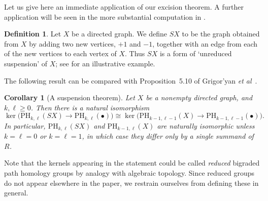 \documentclass[a4paper, 11 pt, oneside, reqno]{amsart}
\numberwithin{lemma}{section}
\newtheorem{corollary}[lemma]{Corollary}
\theoremstyle{definition}
\newtheorem{definition}[lemma]{Definition}
\newcommand{\PH}{\mathrm{PH}}
\begin{document}
Let us give here an immediate application of our excision theorem. A further application will be seen in the more substantial computation in .

\begin{definition}
    Let $X$ be a directed graph.
    We define $SX$ to be the graph obtained from $X$ by 
    adding two new vertices, $+1$ and $-1$, together with an
    edge from each of the new vertices to each vertex of $X$.
    Thus $SX$ is a form of `unreduced suspension' of $X$; see  for an illustrative example.
\end{definition}

The following result can be compared with Proposition~5.10
of Grigor'yan \textit{et al}~\cite{PH-path-complexes}.

\begin{corollary}[A suspension theorem]
\label{cor:suspension}
    Let $X$ be a nonempty directed graph, and
    $k,\ell\geq 0$.
    Then there is a natural isomorphism
    \[
        \ker\bigl(\PH_{k,\ell}(SX)\to\PH_{k,\ell}(\bullet)\bigr)
        \cong
        \ker\bigl(\PH_{k-1,\ell-1}(X)\to\PH_{k-1,\ell-1}(\bullet)\bigr).
    \]
    In particular,
    $\PH_{k,\ell}(SX)$ and $\PH_{k-1,\ell}(X)$ are 
    naturally isomorphic unless $k=\ell=0$ or $k=\ell=1$,
    in which case they differ only by a single summand of $R$.
\end{corollary}

Note that the kernels appearing in the statement could be called
\emph{reduced} bigraded path homology groups by analogy with 
algebraic topology.
Since reduced groups do not appear elsewhere in the paper,
we restrain ourselves from defining these in general.
\end{document}
